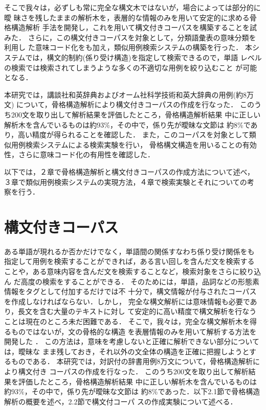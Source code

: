 そこで我々は，必ずしも常に完全な構文木ではないが，場合によっては部分的に曖
昧さを残したままの解析木を，表層的な情報のみを用いて安定的に求める骨格構造解析
手法を開発し，これを用いて構文付きコーパスを構築することを試みた．
さらに，この構文付きコーパスを対象として，分類語彙表の意味分類を利用し
た意味コード化をも加え，類似用例検索システムの構築を行った．
本システムでは，構文的制約(係り受け構造)を指定して検索できるので，単語
レベルの検索では検索されてしまうような多くの不適切な用例を絞り込むこと
が可能となる．

本研究では，講談社和英辞典およびオーム社科学技術和英大辞典の用例(約8万文)
について，骨格構造解析により構文付きコーパスの作成を行なった．
このうち200文を取り出して解析結果を評価したところ，骨格構造解析結果
中に正しい解析木を含んでいるものは約93\%，その中で，係り先が曖昧な文節は
約8\%であり，高い精度が得られることを確認した．
また，このコーパスを対象として類似用例検索システムによる検索実験を行い，
骨格構文構造を用いることの有効性，さらに意味コード化の有用性を確認した．

以下では，２章で骨格構造解析と構文付きコーパスの作成方法について述べ，
３章で類似用例検索システムの実現方法，４章で検索実験とそれについての考
察を行う．

\section{構文付きコーパス}
ある単語が現れるか否かだけでなく，単語間の関係すなわち係り受け関係をも
指定して用例を検索することができれば，ある言い回しを含んだ文を検索する
ことや，ある意味内容を含んだ文を検索することなど，検索対象をさらに絞り込ん
だ高度の検索をすることができる．
そのためには，単語，品詞などの形態素情報をタグとして付加するだけでは不
十分で，構文情報が付与されたコーパスを作成しなければならない．しかし，
完全な構文解析には意味情報も必要であり，長文を含む大量のテキストに対し
て安定的に高い精度で構文解析を行なうことは現在のところ未だ困難である．
そこで，我々は，完全な構文解析木を得るものではないが，文の骨格的な構造
を表層情報のみを用いて解析する方法を開発した
\cite{HyodoAndIkeda1995}．
この方法は，意味を考慮しないと正確に解析できない部分については，曖昧な
まま残しておき，それ以外の文全体の構造を正確に把握しようとするものである．
本研究では，対訳付の辞書用例8万文について，骨格構造解析により構文付き
コーパスの作成を行なった．
このうち200文を取り出して解析結果を評価したところ，骨格構造解析結果
中に正しい解析木を含んでいるものは約93\%，その中で，係り先が曖昧な文節は
約8\%であった．以下2.1節で骨格構造解析の概要を述べ，2.2節で構文付コーパ
スの作成実験について述べる．


